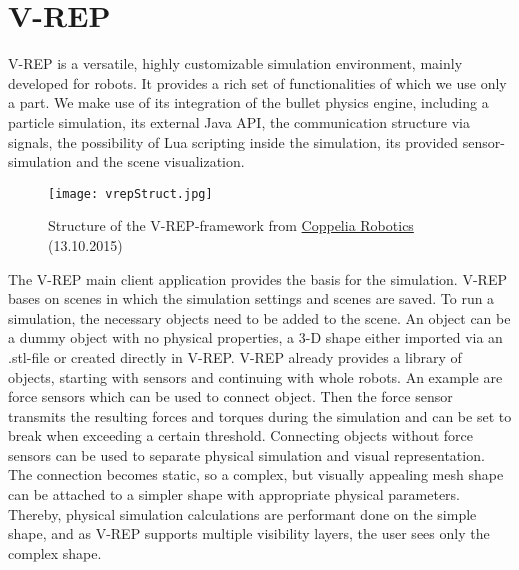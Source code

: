     \section{V-REP}
    \label{sec:theoryVrep}
    V-REP is a versatile, highly customizable simulation environment, mainly developed for robots. 
    It provides a rich set of functionalities of which we use only a part.  
    We make use of its integration of the bullet physics engine, including a particle simulation, its external Java API, the communication structure via signals, the possibility of Lua scripting inside the simulation, its provided sensor-simulation and the scene visualization.
    \begin{figure}[h!]
     \begin{center}
      \texttt{[image: vrepStruct.jpg]}
     \end{center}
      \caption{Structure of the V-REP-framework from \href{http://www.coppeliarobotics.com/helpFiles/en/images/writingCode1.jpg}{Coppelia Robotics} (13.10.2015) \label{fig:vrepStruct}}
    \end{figure}
    
    The V-REP main client application provides the basis for the simulation. 
    V-REP bases on scenes in which the simulation settings and scenes are saved. 
    To run a simulation, the necessary objects need to be added to the scene. 
    An object can be a dummy object with no physical properties, a 3-D shape either imported via an .stl-file or created directly in V-REP. 
    V-REP already provides a library of objects, starting with sensors and continuing with whole robots. 
    An example are force sensors which can be used to connect object. 
    Then the force sensor transmits the resulting forces and torques during the simulation and can be set to break when exceeding a certain threshold. 
    Connecting objects without force sensors can be used to separate physical simulation and visual representation. 
    The connection becomes static, so a complex, but visually appealing mesh shape can be attached to a simpler shape with appropriate physical parameters. 
    Thereby, physical simulation calculations are performant done on the simple shape, and as V-REP supports multiple visibility layers, the user sees only the complex shape.
    
